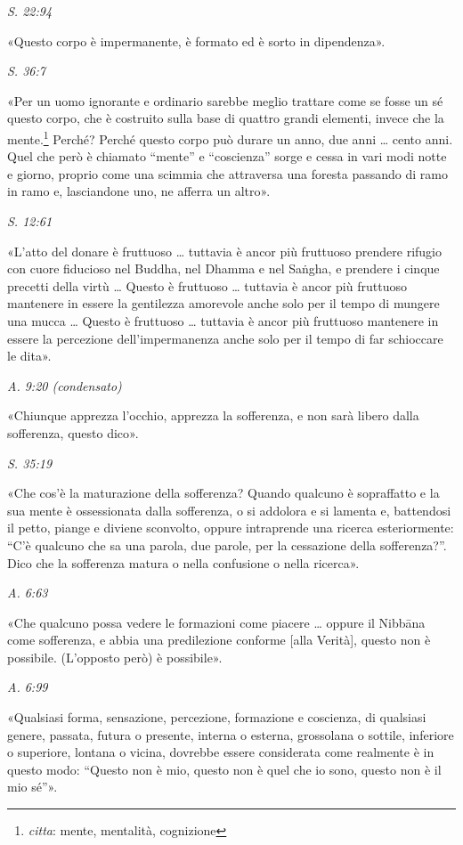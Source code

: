 \emph{S. 22:94}


«Questo corpo è impermanente, è formato ed è sorto in dipendenza».


\emph{S. 36:7}


«Per un uomo ignorante e ordinario sarebbe meglio trattare come se fosse
un sé questo corpo, che è costruito sulla base di quattro grandi
elementi, invece che la mente.\footnote{\emph{citta}: mente, mentalità, cognizione}
Perché? Perché questo
corpo può durare un anno, due anni … cento anni. Quel che però è
chiamato “mente” e “coscienza” sorge e cessa in vari modi notte e
giorno, proprio come una scimmia che attraversa una foresta passando di
ramo in ramo e, lasciandone uno, ne afferra un altro».


\emph{S. 12:61}


«L’atto del donare è fruttuoso … tuttavia è ancor più fruttuoso prendere
rifugio con cuore fiducioso nel Buddha, nel Dhamma e nel Saṅgha, e
prendere i cinque precetti della virtù … Questo è fruttuoso … tuttavia è
ancor più fruttuoso mantenere in essere la gentilezza amorevole anche
solo per il tempo di mungere una mucca … Questo è fruttuoso … tuttavia è
ancor più fruttuoso mantenere in essere la percezione dell’impermanenza
anche solo per il tempo di far schioccare le dita».


\emph{A. 9:20 (condensato)}


«Chiunque apprezza l’occhio, apprezza la sofferenza, e non sarà libero
dalla sofferenza, questo dico».


\emph{S. 35:19}


«Che cos’è la maturazione della sofferenza? Quando qualcuno è
sopraffatto e la sua mente è ossessionata dalla sofferenza, o si
addolora e si lamenta e, battendosi il petto, piange e diviene
sconvolto, oppure intraprende una ricerca esteriormente: “C’è qualcuno
che sa una parola, due parole, per la cessazione della sofferenza?”.
Dico che la sofferenza matura o nella confusione o nella ricerca».


\emph{A. 6:63}


«Che qualcuno possa vedere le formazioni come piacere … oppure il
Nibbāna come sofferenza, e abbia una predilezione conforme [alla
Verità], questo non è possibile. (L’opposto però) è possibile».


\emph{A. 6:99}


«Qualsiasi forma, sensazione, percezione, formazione e coscienza, di
qualsiasi genere, passata, futura o presente, interna o esterna,
grossolana o sottile, inferiore o superiore, lontana o vicina, dovrebbe
essere considerata come realmente è in questo modo: “Questo non è mio,
questo non è quel che io sono, questo non è il mio sé”».


